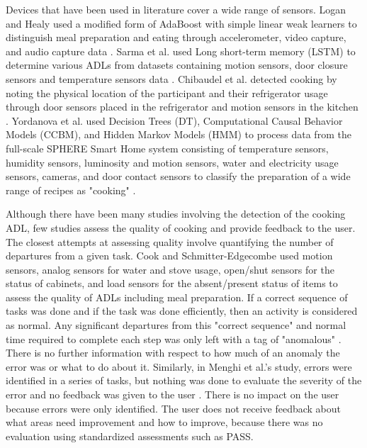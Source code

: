 Devices that have been used in literature cover a wide range of sensors. Logan and Healy used a modified form of AdaBoost with simple linear weak learners to distinguish meal preparation and eating through accelerometer, video capture, and audio capture data \cite{logan_sensors_2006}. Sarma et al. used Long short-term memory (LSTM) to determine various ADLs from datasets containing motion sensors, door closure sensors and temperature sensors data \cite{sarma_activity_2019}. Chibaudel et al. detected cooking by noting the physical location of the participant and their refrigerator usage through door sensors placed in the refrigerator and motion sensors in the kitchen \cite{mokhtari_smart_2018}. Yordanova et al. used Decision Trees (DT), Computational Causal Behavior Models (CCBM), and Hidden Markov Models (HMM) to process data from the full-scale SPHERE Smart Home system consisting of temperature sensors, humidity sensors, luminosity and motion sensors, water and electricity usage sensors, cameras, and door contact sensors to classify the preparation of a wide range of recipes as "cooking" \cite{yordanova_analysing_2019}.

Although there have been many studies involving the detection of the cooking ADL, few studies assess the quality of cooking and provide feedback to the user. The closest attempts at assessing quality involve quantifying the number of departures from a given task. Cook and Schmitter-Edgecombe used motion sensors, analog sensors for water and stove usage, open/shut sensors for the status of cabinets, and load sensors for the absent/present status of items to assess the quality of ADLs including meal preparation. If a correct sequence of tasks was done and if the task was done efficiently, then an activity is considered as normal. Any significant departures from this "correct sequence" and normal time required to complete each step was only left with a tag of "anomalous" \cite{cook_assessing_2009}. There is no further information with respect to how much of an anomaly the error was or what to do about it.  Similarly, in Menghi et al.'s study, errors were identified in a series of tasks, but nothing was done to evaluate the severity of the error and no feedback was given to the user \cite{mokhtari_smart_2018}. There is no impact on the user because errors were only identified. The user does not receive feedback about what areas need improvement and how to improve, because there was no evaluation using standardized assessments such as PASS.

